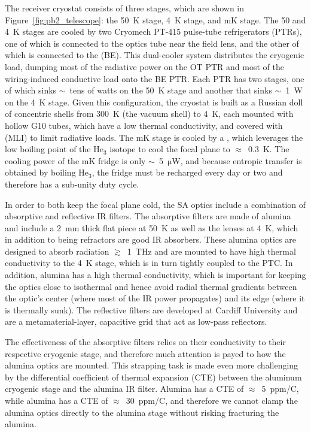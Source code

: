 The receiver cryostat consists of three stages, which are shown in Figure~\ref{fig:pb2_telescope}: the 50~K stage, 4~K stage, and mK stage. The 50 and 4~K stages are cooled by two Cryomech PT-415 pulse-tube refrigerators (PTRs), one of which is connected to the optics tube near the field lens, and the other of which is connected to the  (BE). This dual-cooler system distributes the cryogenic load, dumping most of the radiative power on the OT PTR and most of the wiring-induced conductive load onto the BE PTR. Each PTR has two stages, one of which sinks $\sim$~tens of watts on the 50~K stage and another that sinks $\sim$~1~W on the 4~K stage. Given this configuration, the cryostat is built as a Russian doll of concentric shells from 300~K (the vacuum shell) to 4~K, each mounted with hollow G10 tubes, which have a low thermal conductivity, and covered with  (MLI) to limit radiative loads. The mK stage is cooled by a , which leverages the low boiling point of the $\mathrm{He_{3}}$ isotope to cool the focal plane to $\approx$~0.3~K. The cooling power of the mK fridge is only $\sim$~5~$\mathrm{\mu W}$, and because entropic transfer is obtained by boiling $\mathrm{He_{3}}$, the fridge must be recharged every day or two and therefore has a sub-unity duty cycle. 

In order to both keep the focal plane cold, the SA optics include a combination of absorptive and reflective IR filters. The absorptive filters are made of alumina and include a 2~mm thick flat piece at 50~K as well as the lenses at 4~K, which in addition to being refractors are good IR absorbers. These alumina optics are designed to absorb radiation $\gtrsim$~1~THz and are mounted to have high thermal conductivity to the 4~K stage, which is in turn tightly coupled to the PTC. In addition, alumina has a high thermal conductivity, which is important for keeping the optics close to isothermal and hence avoid radial thermal gradients between the optic's center (where most of the IR power propagates) and its edge (where it is thermally sunk). The reflective filters are developed at Cardiff University and are a metamaterial-layer, capacitive grid that act as low-pass reflectors.

The effectiveness of the absorptive filters relies on their conductivity to their respective cryogenic stage, and therefore much attention is payed to how the alumina optics are mounted. This strapping task is made even more challenging by the differential coefficient of thermal expansion (CTE) between the aluminum cryogenic stage and the alumina IR filter. Alumina has a CTE of $\approx$~5~ppm/C, while alumina has a CTE of $\approx$~30~ppm/C, and therefore we cannot clamp the alumina optics directly to the alumina stage without risking fracturing the alumina.

